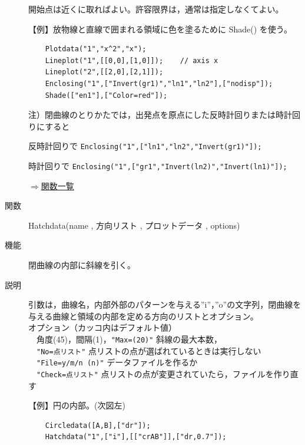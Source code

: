 \documentclass[papersize,a4paper,12pt,uplatex]{jsarticle}
\begin{document}
\begin{description}
開始点は近くに取ればよい。許容限界は，通常は指定しなくてよい。

\vspace{\baselineskip}
【例】放物線と直線で囲まれる領域に色を塗るために Shade() を使う。
\begin{verbatim}
    Plotdata("1","x^2","x");
    Lineplot("1",[[0,0],[1,0]]);    // axis x
    Lineplot("2",[[2,0],[2,1]]);
    Enclosing("1",["Invert(gr1)","ln1","ln2"],["nodisp"]);
    Shade(["en1"],["Color=red"]);
\end{verbatim}
\vspace{\baselineskip}
 \begin{center}  \end{center}

\vspace{\baselineskip}
注）閉曲線のとりかたでは，出発点を原点にした反時計回りまたは時計回りにすると

    反時計回りで  \verb|Enclosing("1",["ln1","ln2","Invert(gr1)"]);|

    時計回りで    \verb|Enclosing("1",["gr1","Invert(ln2)","Invert(ln1)"]);|

\begin{flushright}  \hyperlink{functionlist}{$\Rightarrow$関数一覧}\end{flushright}

\vspace{\baselineskip}
\hypertarget{hatchdata}{}
\item[関数]  Hatchdata(name , 方向リスト , プロットデータ , options)
\item[機能]  閉曲線の内部に斜線を引く。
\item[説明]  引数は，曲線名，内部外部のパターンを与える''i''，''o''の文字列，閉曲線を与える曲線と領域の内部を定める方向のリストとオプション。\\
オプション（カッコ内はデフォルト値）\\
　角度(45)，間隔(1)，\verb|"Max=(20)"| 斜線の最大本数，\\
　\verb|"No=点リスト"| 点リストの点が選ばれているときは実行しない\\
　\verb|"File=y/m/n (n)"| データファイルを作るか\\
　\verb|"Check=点リスト"| 点リストの点が変更されていたら，ファイルを作り直す
 
\vspace{\baselineskip}
【例】円の内部。(次図左)
\begin{verbatim}
    Circledata([A,B],["dr"]);
    Hatchdata("1",["i"],[["crAB"]],["dr,0.7"]);
\end{verbatim}


\end{description}
\end{document}
